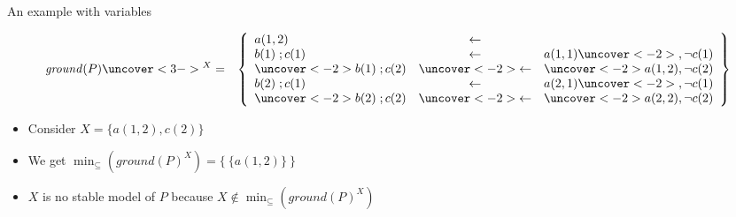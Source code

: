 \begin{frame}{An example with variables}

  \begin{eqnarray*}
    \mathit{ground}(P)\uncover<3->{^X}
    &=&
    \left\{
    \begin{array}{lcl}
      a(1,2)                    & \leftarrow               &
      \\
      b(1)\;;c(1)               & \leftarrow               & a(1,1)\uncover<-2>{, {\neg c(1)}}
      \\
      \uncover<-2>{b(1)\;;c(2)} & \uncover<-2>{\leftarrow} & \uncover<-2>{a(1,2), {\neg c(2)}}
      \\
      b(2)\;;c(1)               & \leftarrow               & a(2,1)\uncover<-2>{, {\neg c(1)}}
      \\
      \uncover<-2>{b(2)\;;c(2)} & \uncover<-2>{\leftarrow} & \uncover<-2>{a(2,2), {\neg c(2)}}
    \end{array}
    \right\}
  \end{eqnarray*}

  \begin{itemize}
    \item <2->
          Consider $X=\{a(1,2),  c(2)\}$
    \item <4->
          We get
          \(
          \min_\subseteq(\mathit{ground}(P)^X)
          =
          \{\ \{a(1,2)\}\ \}
          \)
    \item<5->
          $X$ is no stable model of $P$ because
          \(
          X\not\in\min_\subseteq(\mathit{ground}(P)^X)
          \)
  \end{itemize}
\end{frame}
